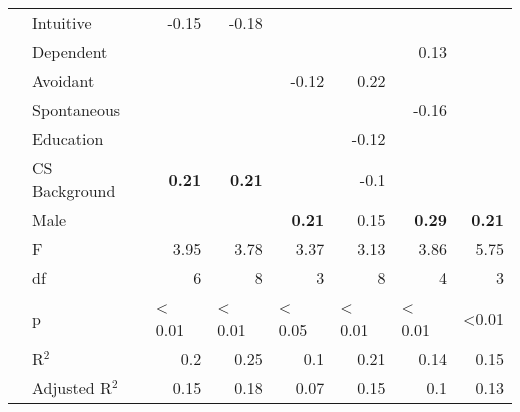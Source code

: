 \begin{table*}[h]
\begin{tabular}{rl|rr|rrrr}
    \rowcolor[rgb]{ .988,  .835,  .706}   & Intuitive & \cellcolor[rgb]{ .98,  .627,  .459} -0.15 & \cellcolor[rgb]{ .98,  .596,  .455} -0.18 & \cellcolor[rgb]{ 1,  1,  1}  & \cellcolor[rgb]{ 1,  1,  1}  & \cellcolor[rgb]{ 1,  1,  1}  & \cellcolor[rgb]{ 1,  1,  1}  \\
    \rowcolor[rgb]{ .988,  .835,  .706}   & Dependent & \cellcolor[rgb]{ 1,  1,  1}  & \cellcolor[rgb]{ 1,  1,  1}  & \cellcolor[rgb]{ 1,  1,  1}  & \cellcolor[rgb]{ 1,  1,  1}  & \cellcolor[rgb]{ .984,  .918,  .518} 0.13 & \cellcolor[rgb]{ 1,  1,  1}  \\
    \rowcolor[rgb]{ .988,  .835,  .706}   & Avoidant & \cellcolor[rgb]{ 1,  1,  1}  & \cellcolor[rgb]{ 1,  1,  1}  & \cellcolor[rgb]{ .984,  .659,  .467} -0.12 & \cellcolor[rgb]{ .827,  .875,  .51} 0.22 & \cellcolor[rgb]{ 1,  1,  1}  & \cellcolor[rgb]{ 1,  1,  1}  \\
    \rowcolor[rgb]{ .988,  .835,  .706}   & Spontaneous & \cellcolor[rgb]{ 1,  1,  1}  & \cellcolor[rgb]{ 1,  1,  1}  & \cellcolor[rgb]{ 1,  1,  1}  & \cellcolor[rgb]{ 1,  1,  1}  & \cellcolor[rgb]{ .98,  .616,  .459} -0.16 & \cellcolor[rgb]{ 1,  1,  1}  \\
      & Education &   &   &   & \cellcolor[rgb]{ .984,  .659,  .467} -0.12 &   &  \\
      & CS Background & \cellcolor[rgb]{ .843,  .878,  .51} \textbf{0.21} & \cellcolor[rgb]{ .843,  .878,  .51} \textbf{0.21} &   & \cellcolor[rgb]{ .984,  .682,  .471} -0.1 &   &  \\
      & Male &   &   & \cellcolor[rgb]{ .843,  .878,  .51} \textbf{0.21} & \cellcolor[rgb]{ .949,  .91,  .518} 0.15 & \cellcolor[rgb]{ .706,  .839,  .502} \textbf{0.29} & \cellcolor[rgb]{ .843,  .878,  .51} \textbf{0.21} \\
    \midrule
      & F & 3.95 & 3.78 & 3.37 & 3.13 & 3.86 & 5.75 \\
      & df & 6 & 8 & 3 & 8 & 4 & 3 \\
      & p & \multicolumn{1}{l}{< 0.01} & \multicolumn{1}{l|}{< 0.01} & \multicolumn{1}{l}{< 0.05} & \multicolumn{1}{l}{< 0.01} & \multicolumn{1}{l}{< 0.01} & \multicolumn{1}{l}{<0.01} \\
      & R$^2$ & \cellcolor[rgb]{ .533,  .804,  .608} 0.2 & \cellcolor[rgb]{ .388,  .745,  .482} 0.25 & \cellcolor[rgb]{ .82,  .922,  .855} 0.1 & \cellcolor[rgb]{ .506,  .792,  .584} 0.21 & \cellcolor[rgb]{ .706,  .875,  .757} 0.14 & \cellcolor[rgb]{ .675,  .863,  .729} 0.15 \\
      & Adjusted R$^2$& \cellcolor[rgb]{ .494,  .788,  .576} 0.15 & \cellcolor[rgb]{ .388,  .745,  .482} 0.18 & \cellcolor[rgb]{ .776,  .906,  .82} 0.07 & \cellcolor[rgb]{ .494,  .788,  .576} 0.15 & \cellcolor[rgb]{ .671,  .863,  .729} 0.1 & \cellcolor[rgb]{ .565,  .82,  .635} 0.13 \\
    \bottomrule
    \bottomrule
    \end{tabular}%
  \label{tab:Comparison-Regression}%
\end{table*}%
